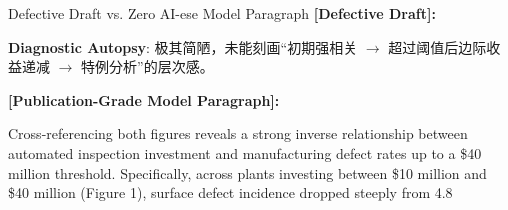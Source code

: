 \begin{ExampleBox}{Defective Draft vs. Zero AI-ese Model Paragraph}
\textbf{\color{TargetHighlight}[Defective Draft]:}\par
{}\par\vspace{4pt}
\textbf{Diagnostic Autopsy}: 极其简陋，未能刻画“初期强相关 $\to$ 超过阈值后边际收益递减 $\to$ 特例分析”的层次感。\par\vspace{6pt}
\textbf{\color{AcadNavy}[Publication-Grade Model Paragraph]:}\par
Cross-referencing both figures reveals a strong inverse relationship between automated inspection investment and manufacturing defect rates up to a \$40 million threshold. Specifically, across plants investing between \$10 million and \$40 million (Figure 1), surface defect incidence dropped steeply from 4.8%
\end{ExampleBox}
